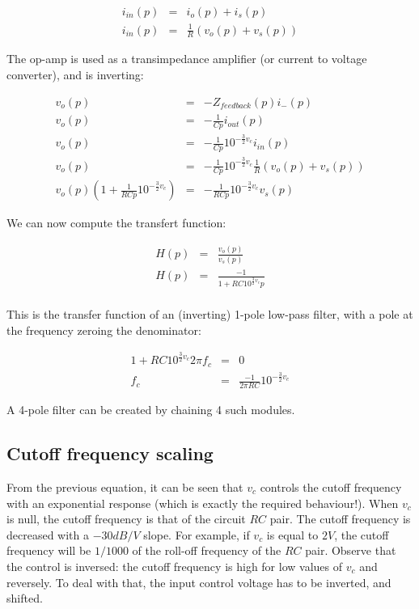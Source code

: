 \documentclass[a4paper,11pt]{article}
\begin{document}
\begin{eqnarray*}
i_{in}(p) &=& i_o(p) + i_s(p) \\
i_{in}(p) &=& \frac{1}{R}(v_o(p) + v_s(p))
\end{eqnarray*}

The op-amp is used as a transimpedance amplifier (or current to voltage converter), and is inverting:

\begin{eqnarray*}
v_o(p) &=& -Z_{feedback}(p) i_-(p) \\
v_o(p) &=& -\frac{1}{Cp} i_{out}(p) \\
v_o(p) &=& -\frac{1}{Cp} 10^{-\frac{3}{2} v_c} i_{in}(p) \\
v_o(p) &=& -\frac{1}{Cp} 10^{-\frac{3}{2} v_c} \frac{1}{R}(v_o(p) + v_s(p)) \\
v_o(p) \left(1 + \frac{1}{RCp} 10^{-\frac{3}{2} v_c} \right) &=& -\frac{1}{RCp} 10^{-\frac{3}{2} v_c}v_s(p)
\end{eqnarray*}

We can now compute the transfert function:

\begin{eqnarray*}
H(p) &=& \frac{v_o(p)}{v_s(p)} \\
H(p) &=& \frac{-1}{1 + RC 10^{\frac{3}{2} v_c} p} \\
\end{eqnarray*}

This is the transfer function of an (inverting) 1-pole low-pass filter, with a pole at the frequency zeroing the denominator:

\begin{eqnarray*}
1 + RC 10^{\frac{3}{2} v_c} 2 \pi f_c &=& 0 \\
f_c &=& \frac{-1}{2 \pi RC} 10^{-\frac{3}{2} v_c}
\end{eqnarray*}

A 4-pole filter can be created by chaining 4 such modules.

\subsection{Cutoff frequency scaling}

From the previous equation, it can be seen that $v_c$ controls the cutoff frequency with an exponential response (which is exactly the required behaviour!). When $v_c$ is null, the cutoff frequency is that of the circuit $RC$ pair. The cutoff frequency is decreased with a $-30dB/V$ slope. For example, if $v_c$ is equal to $2V$, the cutoff frequency will be $1/1000$ of the roll-off frequency of the $RC$ pair. Observe that the control is inversed: the cutoff frequency is high for low values of $v_c$ and reversely. To deal with that, the input control voltage has to be inverted, and shifted.
\end{document}
